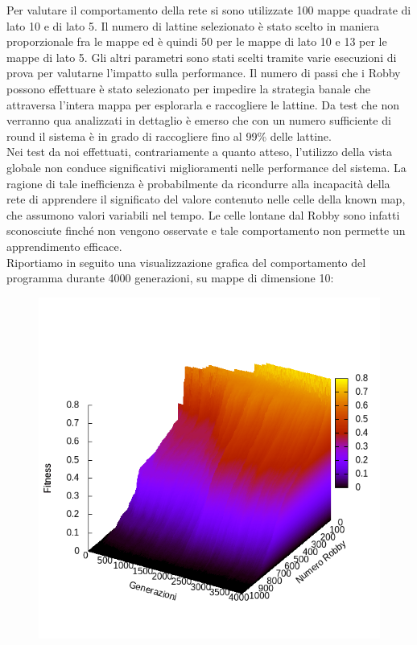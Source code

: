 Per valutare il comportamento della rete si sono utilizzate 100 mappe quadrate 
di lato 10 e di lato 5. Il numero di lattine selezionato è stato scelto in 
maniera proporzionale fra le mappe ed è quindi 50 per le mappe di lato 10 e 13 
per le mappe di lato 5. Gli altri parametri sono stati scelti tramite varie 
esecuzioni di prova per valutarne l'impatto sulla performance. Il numero di 
passi che i Robby possono effettuare è stato selezionato per impedire la 
strategia banale che attraversa l'intera mappa per esplorarla e raccogliere le 
lattine. Da test che non verranno qua analizzati in dettaglio è emerso che con 
un numero sufficiente di round il sistema è in grado di raccogliere fino al 
99\% delle lattine.
\\
Nei test da noi effettuati, contrariamente a quanto atteso, l'utilizzo della 
vista globale non conduce significativi miglioramenti nelle performance del 
sistema. La ragione di tale inefficienza è probabilmente da ricondurre alla 
incapacità della rete di apprendere il significato del valore contenuto 
nelle celle della known map, che assumono valori variabili nel tempo. Le celle 
lontane dal Robby sono infatti sconosciute finché non vengono osservate e tale 
comportamento non permette un apprendimento efficace.
\\
Riportiamo in seguito una visualizzazione grafica del comportamento del 
programma durante 4000 generazioni, su mappe di dimensione 10:
\begin{figure}[H]
\includegraphics[width=.8\textwidth]{img/graph10x10.png}
\caption{}
\end{figure}
